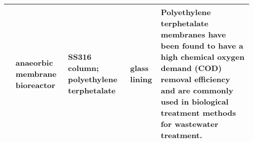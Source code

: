 {\begin{tabular}{@{}lp{5cm}p{2cm}p{2cm}p{12cm}@{}}
                                                      & anaeorbic membrane bioreactor                          & SS316 column; polyethylene terphetalate                                                 & glass lining                                      & Polyethylene terphetalate membranes have been found to have a high chemical oxygen demand (COD) removal efficiency and are commonly used in biological treatment methods for wastewater treatment.                                                                                                                                                                                                                                                                                                                                                                                                                                                                                                                                                                                                                                                                                                                  \\ \bottomrule
\end{tabular}%
}